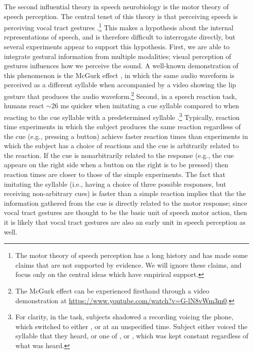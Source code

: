 The second influential theory
in speech neurobiology is the
motor theory of speech perception.
The central tenet of this theory
is that perceiving speech
is perceiving vocal tract gestures
\citep{liberman1985,galantucci2006}.\footnote{
  The motor theory of speech perception has a long history
  and has made some claims that are not supported by evidence.
  We will ignore these claims, and focus only on
  the central ideas which have empirical support.}
This makes a hypothesis about
the internal representations of speech,
and is therefore difficult
to interrogate directly,
but several experiments appear
to support this hypothesis.
First, we are able to integrate
gestural information from multiple modalities;
visual perception of gestures
influences how we perceive the sound.
A well-known demonstration of
this phenomenon is the McGurk effect
\citep{mcgurk1976},
in which the same audio waveform
is perceived as a different syllable
when accompanied by a video
showing the lip gesture that produces
the audio waveform.\footnote{
  The McGurk effect can be experienced firsthand through
  a video demonstration at
  \url{https://www.youtube.com/watch?v=G-lN8vWm3m0}.}
Second, in a speech reaction task,
humans react $\sim$26 ms quicker
when imitating a cue syllable
compared to when reacting
to the cue syllable
with a predetermined syllable
\citep{fowler2003}.\footnote{
  For clarity, in the task, subjects
  shadowed a recording voicing the \ipa{[A]} phone,
  which switched to either \ipa{[pA]}, \ipa{[tA]} or \ipa{[kA]} at an
  unspecified time.
  Subject either voiced the syllable that they heard,
  or one of \ipa{[pA]}, \ipa{[tA]} or \ipa{[kA]},
  which was kept constant regardless of what was heard.}
Typically, reaction time experiments
in which the subject produces the same reaction
regardless of the cue (e.g., pressing a button)
achieve faster reaction times
than experiments in which the subject
has a choice of reactions
and the cue is arbitrarily related
to the reaction.
If the cue is nonarbitrarily related
to the response
(e.g., the cue appears on the right side
when a button on the right is to be pressed)
then reaction times are closer to those
of the simple experiments.
The fact that imitating the syllable
(i.e., having a choice of three possible responses,
but receiving non-arbitrary cues)
is faster than a simple reaction
implies that the the information gathered
from the cue is directly related
to the motor response;
since vocal tract gestures are thought
to be the basic unit of speech motor action,
then it is likely that vocal tract gestures
are also an early unit
in speech perception as well.

